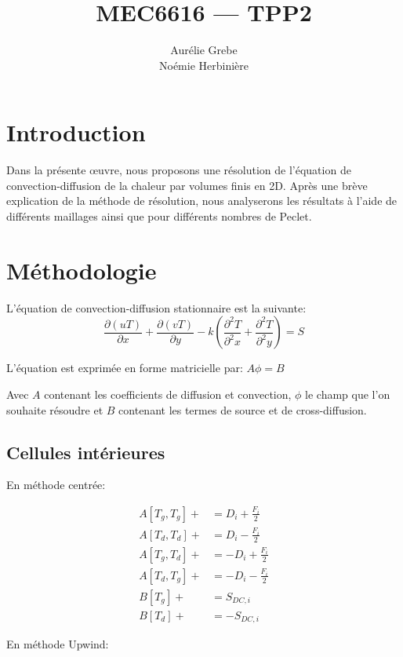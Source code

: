 \documentclass[12pt]{article}
\title{MEC6616 --- TPP2}
\author{Aurélie Grebe\\Noémie Herbinière}
\date{\displaydate{duedate}}
\begin{document}
\maketitle

\section{Introduction}

Dans la présente œuvre, nous proposons une résolution de l'équation de convection-diffusion
de la chaleur par volumes finis en 2D. Après une brève explication de
la méthode de résolution, nous analyserons les résultats à l'aide de différents maillages ainsi que pour différents nombres de Peclet.

\section{Méthodologie}

L'équation de convection-diffusion stationnaire est la suivante:
\begin{equation} 
\frac{\partial {(uT)}}{\partial x} + \frac{\partial {(vT)}}{\partial y} - k \left(\frac{\partial^2 {T}}{\partial^2 x} + \frac{\partial^2 {T}}{\partial^2 y} \right) = S
\label{eq:conv_diff}
\end{equation}

L'équation est exprimée en forme matricielle par: $A\phi = B$

Avec $A$ contenant les coefficients de diffusion et convection, $\phi$ le champ que l'on souhaite résoudre et $B$ contenant les termes de source et de cross-diffusion.

\subsection{Cellules intérieures}

En méthode centrée:

\begin{align}
	A[T_g,T_g] + &= D_i + \frac{F_i}{2}\\
	A[T_d,T_d] + &= D_i - \frac{F_i}{2}\\
	A[T_g,T_d] + &= -D_i + \frac{F_i}{2}\\
	A[T_d,T_g] + &= -D_i - \frac{F_i}{2}\\
	B[T_g] + &= S_{DC,i} \\
	B[T_d] + &= -S_{DC,i}
\end{align}

En méthode Upwind:
\end{document}
